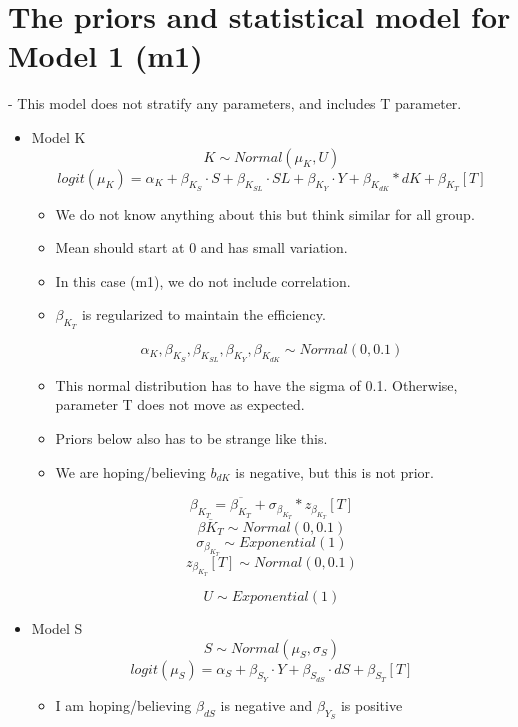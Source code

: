 \documentclass{article}
\begin{document}
\newpage
\section{The priors and statistical model for Model 1 (m1)}
- This model does not stratify any parameters, and includes T parameter. 

\begin{itemize}
\item Model K
$$K \sim Normal(\mu_K, U) $$
$$logit(\mu_K) = \alpha _{K} + \beta _{K_S} \cdot S + \beta _{K_{SL}} \cdot SL + \beta _{K_{Y}} \cdot Y + \beta _{K_{dK}} * dK + \beta _{K_T}[T]$$
\begin{itemize}
    \item We do not know anything about this but think similar for all group. 
    \item Mean should start at 0 and has small variation.
    \item In this case (m1), we do not include correlation. 
    \item $\beta _{K_T}$ is regularized to maintain the efficiency. 

\end{itemize}

$$\alpha _K, \beta _{K_S }, \beta _{K_{SL} }, \beta _{K_Y }, \beta _{K_{dK}}  \sim Normal(0,0.1)$$
\begin{itemize}
    \item This normal distribution has to have the sigma of 0.1. Otherwise, parameter T does not move as expected.
    \item Priors below also has to be strange like this. 
    \item We are hoping/believing $b_{dK}$ is negative, but this is not prior. 

\end{itemize}

$$\beta _{K_T} = \overline{\beta _{K_T}} + \sigma_{\beta _{K_T}} * z_{\beta_{K_T}}[T]$$
$$\overline{\beta {K_T}} \sim Normal(0, 0.1)$$
$$\sigma_{\beta _{K_T}} \sim Exponential(1)$$
$$z_{\beta _{K_T}}[T] \sim Normal(0, 0.1)$$

$$U \sim Exponential(1)$$


\item Model S 
$$S \sim Normal(\mu_S, \sigma_S)$$
$$logit(\mu_S) = \alpha _S + \beta _{S_Y} \cdot Y + \beta _ {S_{dS}} \cdot dS + \beta _{S_T}[T]$$
\begin{itemize}
    \item I am hoping/believing $\beta_{dS}$ is negative and $\beta_{Y_S}$ is positive 
\end{itemize}


\end{itemize}
\end{document}
